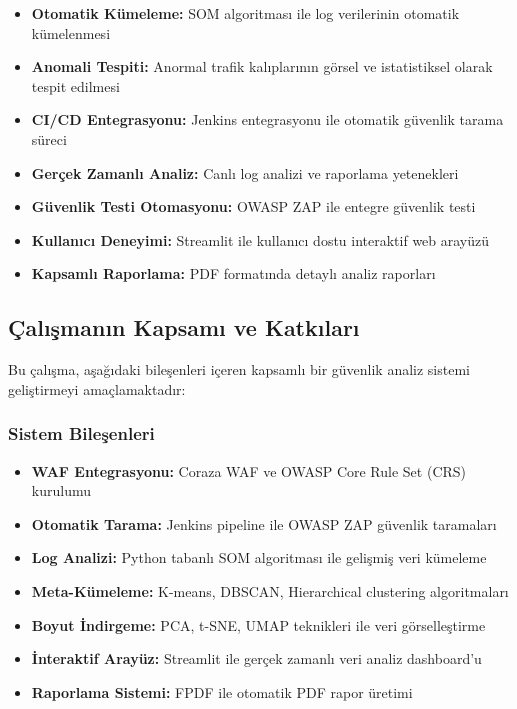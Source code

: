 \begin{itemize}
    \item \textbf{Otomatik Kümeleme:} SOM algoritması ile log verilerinin otomatik kümelenmesi \cite{som_network_security2018}
\item \textbf{Anomali Tespiti:} Anormal trafik kalıplarının görsel ve istatistiksel olarak tespit edilmesi \cite{vesanto2000som}
    \item \textbf{CI/CD Entegrasyonu:} Jenkins entegrasyonu ile otomatik güvenlik tarama süreci \cite{jenkins2023}
    \item \textbf{Gerçek Zamanlı Analiz:} Canlı log analizi ve raporlama yetenekleri
    \item \textbf{Güvenlik Testi Otomasyonu:} OWASP ZAP \cite{owasp_zap} ile entegre güvenlik testi
    \item \textbf{Kullanıcı Deneyimi:} Streamlit ile kullanıcı dostu interaktif web arayüzü \cite{streamlit2023}
    \item \textbf{Kapsamlı Raporlama:} PDF formatında detaylı analiz raporları
\end{itemize}

\subsection{Çalışmanın Kapsamı ve Katkıları}

Bu çalışma, aşağıdaki bileşenleri içeren kapsamlı bir güvenlik analiz sistemi geliştirmeyi amaçlamaktadır:

\subsubsection{Sistem Bileşenleri}

\begin{itemize}
    \item \textbf{WAF Entegrasyonu:} Coraza WAF ve OWASP Core Rule Set (CRS) \cite{owasp_crs} kurulumu
    \item \textbf{Otomatik Tarama:} Jenkins pipeline ile OWASP ZAP güvenlik taramaları
    \item \textbf{Log Analizi:} Python tabanlı SOM algoritması ile gelişmiş veri kümeleme \cite{python_security2021}
    \item \textbf{Meta-Kümeleme:} K-means, DBSCAN, Hierarchical clustering algoritmaları
    \item \textbf{Boyut İndirgeme:} PCA, t-SNE, UMAP teknikleri ile veri görselleştirme
    \item \textbf{İnteraktif Arayüz:} Streamlit ile gerçek zamanlı veri analiz dashboard'u
    \item \textbf{Raporlama Sistemi:} FPDF ile otomatik PDF rapor üretimi
\end{itemize}


